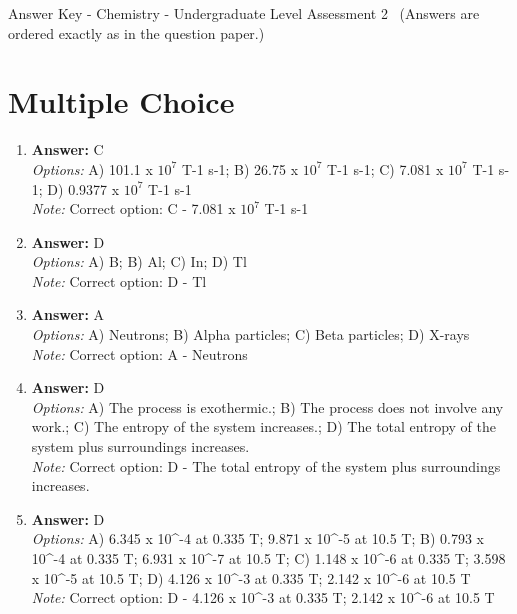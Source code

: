 \documentclass[12pt]{article}
\begin{document}
\begin{center}
Answer Key - Chemistry - Undergraduate Level Assessment 2 \
\small (Answers are ordered exactly as in the question paper.)
\end{center}

\section*{Multiple Choice}
\begin{enumerate}[label=\arabic*.]
\item \textbf{Answer:} C
\\ \textit{Options:} A) 101.1 x $10^7$ T-1 s-1; B) 26.75 x $10^7$ T-1 s-1; C) 7.081 x $10^7$ T-1 s-1; D) 0.9377 x $10^7$ T-1 s-1
\\ \textit{Note:} Correct option: C - 7.081 x $10^7$ T-1 s-1
\item \textbf{Answer:} D
\\ \textit{Options:} A) B; B) Al; C) In; D) Tl
\\ \textit{Note:} Correct option: D - Tl
\item \textbf{Answer:} A
\\ \textit{Options:} A) Neutrons; B) Alpha particles; C) Beta particles; D) X-rays
\\ \textit{Note:} Correct option: A - Neutrons
\item \textbf{Answer:} D
\\ \textit{Options:} A) The process is exothermic.; B) The process does not involve any work.; C) The entropy of the system increases.; D) The total entropy of the system plus surroundings increases.
\\ \textit{Note:} Correct option: D - The total entropy of the system plus surroundings increases.
\item \textbf{Answer:} D
\\ \textit{Options:} A) 6.345 x 10^-4 at 0.335 T; 9.871 x 10^-5 at 10.5 T; B) 0.793 x 10^-4 at 0.335 T; 6.931 x 10^-7 at 10.5 T; C) 1.148 x 10^-6 at 0.335 T; 3.598 x 10^-5 at 10.5 T; D) 4.126 x 10^-3 at 0.335 T; 2.142 x 10^-6 at 10.5 T
\\ \textit{Note:} Correct option: D - 4.126 x 10^-3 at 0.335 T; 2.142 x 10^-6 at 10.5 T
\end{enumerate}
\end{document}

